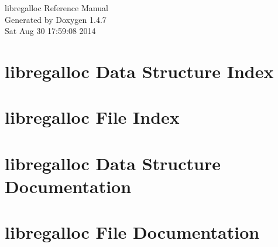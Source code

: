 \documentclass[letterpaper]{book}
\begin{document}
\begin{titlepage}
\vspace*{7cm}
\begin{center}
{\Large libregalloc Reference Manual}\\
\vspace*{1cm}
{\large Generated by Doxygen 1.4.7}\\
\vspace*{0.5cm}
{\small Sat Aug 30 17:59:08 2014}\\
\end{center}
\end{titlepage}
\clearemptydoublepage
{}
\tableofcontents
\clearemptydoublepage
{}
\chapter{libregalloc Data Structure Index}

\chapter{libregalloc File Index}

\chapter{libregalloc Data Structure Documentation}










\chapter{libregalloc File Documentation}












\printindex
\end{document}
